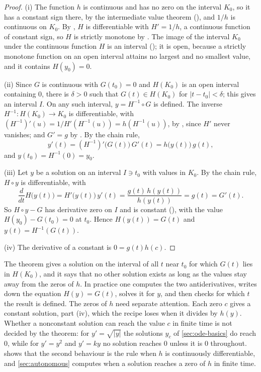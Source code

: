 \begin{proof}
(i) The function $h$ is continuous and has no zero on the interval $K_0$, so it has a constant sign there, by the intermediate value theorem (), and $1/h$ is continuous on $K_0$. By , $H$ is differentiable with $H'=1/h$, a continuous function of constant sign, so $H$ is strictly monotone by . The image of the interval $K_0$ under the continuous function $H$ is an interval (); it is open, because a strictly monotone function on an open interval attains no largest and no smallest value, and it contains $H(y_0)=0$.

(ii) Since $G$ is continuous with $G(t_0)=0$ and $H(K_0)$ is an open interval containing $0$, there is $\delta>0$ such that $G(t)\in H(K_0)$ for $|t-t_0|<\delta$; this gives an interval $I$. On any such interval, $y=H^{-1}\circ G$ is defined. The inverse $H^{-1}\colon H(K_0)\to K_0$ is differentiable, with $(H^{-1})'(u)=1/H'(H^{-1}(u))=h(H^{-1}(u))$, by , since $H'$ never vanishes; and $G'=g$ by . By the chain rule,
\[
y'(t)=(H^{-1})'\bigl(G(t)\bigr)\,G'(t)=h\bigl(y(t)\bigr)\,g(t),
\]
and $y(t_0)=H^{-1}(0)=y_0$.

(iii) Let $y$ be a solution on an interval $I\ni t_0$ with values in $K_0$. By the chain rule, $H\circ y$ is differentiable, with
\[
\frac d{dt}H\bigl(y(t)\bigr)=H'\bigl(y(t)\bigr)\,y'(t)=\frac{g(t)\,h(y(t))}{h(y(t))}=g(t)=G'(t).
\]
So $H\circ y-G$ has derivative zero on $I$ and is constant (), with the value $H(y_0)-G(t_0)=0$ at $t_0$. Hence $H(y(t))=G(t)$ and $y(t)=H^{-1}(G(t))$.

(iv) The derivative of a constant is $0=g(t)h(c)$.
\end{proof}

The theorem gives a solution on the interval of all $t$ near $t_0$ for which $G(t)$ lies in $H(K_0)$, and it says that no other solution exists as long as the values stay away from the zeros of $h$. In practice one computes the two antiderivatives, writes down the equation $H(y)=G(t)$, solves it for $y$, and then checks for which $t$ the result is defined. The zeros of $h$ need separate attention. Each zero $c$ gives a constant solution, part (iv), which the recipe loses when it divides by $h(y)$. Whether a nonconstant solution can reach the value $c$ in finite time is not decided by the theorem: for $y'=\sqrt{|y|}$ the solutions $y_c$ of \cref{sec:ode-basics} do reach $0$, while for $y'=y^2$ and $y'=ky$ no solution reaches $0$ unless it is $0$ throughout.  shows that the second behaviour is the rule when $h$ is continuously differentiable, and \cref{sec:autonomous} computes when a solution reaches a zero of $h$ in finite time.

